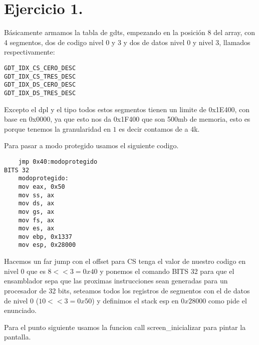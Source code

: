 \section{Ejercicio 1.}
\noindent Básicamente armamos la tabla de gdts, empezando en la posición $8$ del array, con 4 segmentos, dos de codigo nivel $0$ y $3$ y dos de datos nivel $0$ y nivel $3$, llamados respectivamente:

\begin{codesnippet}
\begin{verbatim}
GDT_IDX_CS_CERO_DESC
GDT_IDX_CS_TRES_DESC
GDT_IDX_DS_CERO_DESC
GDT_IDX_DS_TRES_DESC
\end{verbatim}
\end{codesnippet}

\noindent Excepto el dpl y el tipo todos estos segmentos tienen un limite de 0x1E400, con base en 0x0000, ya que esto nos da 0x1F400 que son 500mb de memoria, esto es porque tenemos la granularidad en $1$ es decir contamos de a $4$k.

\noindent Para pasar a modo protegido usamos el siguiente codigo.
\begin{codesnippet}
\begin{verbatim}
    jmp 0x40:modoprotegido
BITS 32
    modoprotegido:
    mov eax, 0x50
    mov ss, ax
    mov ds, ax
    mov gs, ax
    mov fs, ax
    mov es, ax
    mov ebp, 0x1337
    mov esp, 0x28000
\end{verbatim}
\end{codesnippet}

\noindent Hacemos un far jump con el offset para CS tenga el valor de nuestro codigo en nivel $0$ que es $8 << 3 = 0x40$ y ponemos el comando BITS 32 para que el ensamblador sepa que las proximas instrucciones sean generadas para un procesador de 32 bits, seteamos todos los registros de segmentos con el de datos de nivel $0$ ($10 << 3 = 0x50$) y definimos el stack esp en $0x28000$ como pide el enunciado. 

\noindent Para el punto siguiente usamos la funcion call screen\_inicializar para pintar la pantalla.